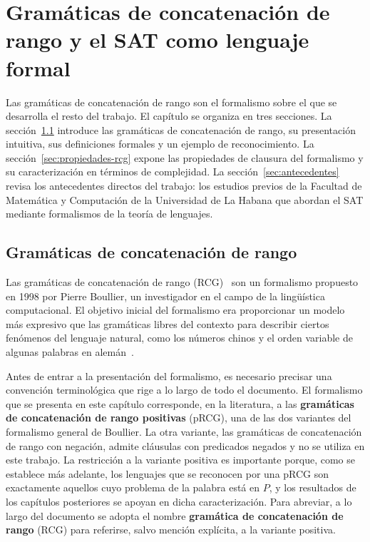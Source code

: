 
\chapter{Gramáticas de concatenación de rango y el SAT como lenguaje formal}
\label{cap:rcg-sat}

Las gramáticas de concatenación de rango son el formalismo sobre el
que se desarrolla el resto del trabajo. El capítulo se organiza en
tres secciones. La sección~\ref{sec:rcg} introduce las gramáticas de
concatenación de rango, su presentación intuitiva, sus definiciones
formales y un ejemplo de reconocimiento. La sección~\ref{sec:propiedades-rcg}
expone las propiedades de clausura del formalismo y su caracterización
en términos de complejidad. La sección~\ref{sec:antecedentes} revisa
los antecedentes directos del trabajo: los estudios previos de la
Facultad de Matemática y Computación de la Universidad de La Habana
que abordan el SAT mediante formalismos de la teoría de lenguajes.

\section{Gramáticas de concatenación de rango}
\label{sec:rcg}

Las gramáticas de concatenación de rango (RCG)~\cite{boullier1998proposal}
son un formalismo propuesto en 1998 por Pierre Boullier, un investigador
en el campo de la lingüística computacional. El objetivo inicial del
formalismo era proporcionar un modelo más expresivo que las gramáticas
libres del contexto para describir ciertos fenómenos del lenguaje
natural, como los números chinos y el orden variable de algunas palabras
en alemán~\cite{boullier1999chinese}.

Antes de entrar a la presentación del formalismo, es necesario precisar
una convención terminológica que rige a lo largo de todo el documento.
El formalismo que se presenta en este capítulo corresponde, en la
literatura, a las \textbf{gramáticas de concatenación de rango
positivas} (pRCG), una de las dos variantes del formalismo general de
Boullier. La otra variante, las gramáticas de concatenación de rango con
negación, admite cláusulas con predicados negados y no se utiliza en
este trabajo. La restricción a la variante positiva es importante
porque, como se establece más adelante, los lenguajes que se reconocen
por una pRCG son exactamente aquellos cuyo problema de la palabra está
en $P$, y los resultados de los capítulos posteriores se apoyan en
dicha caracterización. Para abreviar, a lo largo del documento se adopta el
nombre \textbf{gramática de concatenación de rango} (RCG) para
referirse, salvo mención explícita, a la variante positiva.

